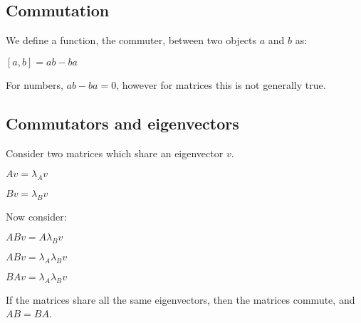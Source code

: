 
\subsection{Commutation}

We define a function, the commuter, between two objects \(a\) and \(b\) as:

\([a,b]=ab-ba\)

For numbers, \(ab-ba=0\), however for matrices this is not generally true.

\subsection{Commutators and eigenvectors}

Consider two matrices which share an eigenvector \(v\).

\(Av=\lambda_A v\)

\(Bv=\lambda_B v\)

Now consider:

\(ABv=A\lambda_B v\)

\(ABv=\lambda_A\lambda_B v\)

\(BAv=\lambda_A\lambda_B v\)

If the matrices share all the same eigenvectors, then the matrices commute, and \(AB=BA\).


